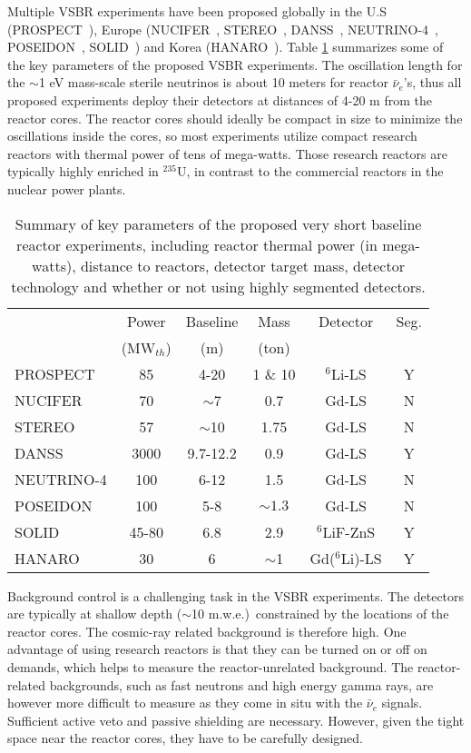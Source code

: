 Multiple VSBR experiments have been proposed globally in the U.S (PROSPECT~\cite{PROSPECT}), Europe (NUCIFER~\cite{NUCIFER-2010, NUCIFER-2014}, STEREO~\cite{NUCIFER-2014}, DANSS~\cite{DANSS}, NEUTRINO-4~\cite{NEUTRINO4-2012,NEUTRINO4-2014}, POSEIDON~\cite{POSEIDON}, SOLID~\cite{SoLid}) and Korea (HANARO~\cite{HANARO}). 
Table \ref{tab:sterile} summarizes some of the key parameters of the proposed VSBR experiments. 
The oscillation length for the $\sim$1 eV mass-scale sterile neutrinos is about 10 meters for reactor $\bar\nu_e$'s, thus all proposed experiments deploy their detectors at distances of 4-20 m from the reactor cores. 
The reactor cores should ideally be compact in size to minimize the oscillations inside the cores, so most experiments utilize compact research reactors with thermal power of tens of mega-watts. Those research reactors are typically highly enriched in $^{235}$U, in contrast to the commercial reactors in the nuclear power plants. 

\begin{table}[tb]
  \begin{tabular}{lccccc}
  \hline
  & Power & Baseline & Mass & Detector & Seg. \\
  & (MW$_{th}$) & (m) & (ton) &    & \\
  \hline
  PROSPECT  & 85  & 4-20 & 1 \& 10  & $^6$Li-LS & Y \\
  NUCIFER   & 70 & $\sim$7  & 0.7 & Gd-LS & N \\
  STEREO & 57  & $\sim$10 & 1.75  & Gd-LS & N \\
  DANSS & 3000  & 9.7-12.2  & 0.9  & Gd-LS & Y \\
  NEUTRINO-4 & 100  & 6-12  & 1.5  & Gd-LS & N \\
  POSEIDON & 100  & 5-8  & $\sim1.3$ & Gd-LS & N \\
  SOLID & 45-80 & 6.8  & 2.9  & $^6$LiF-ZnS & Y \\
  HANARO & 30  & 6  & $\sim$1  & Gd($^6$Li)-LS & Y \\
  \hline
  \end{tabular}
  \caption{Summary of key parameters of the proposed very short baseline reactor experiments, including reactor thermal power (in mega-watts), distance to reactors, detector target mass, detector technology and whether or not using highly segmented detectors.}
\label{tab:sterile}
\end{table}

Background control is a challenging task in the VSBR experiments. 
The detectors are typically at shallow depth ($\sim$10 m.w.e.)\ constrained by the locations of the reactor cores. 
The cosmic-ray related background is therefore high. 
One advantage of using research reactors is that they can be turned on or off on demands, which helps to measure the reactor-unrelated background. 
The reactor-related backgrounds, such as fast neutrons and high energy gamma rays, are however more difficult to measure as they come in situ with the $\bar\nu_e$ signals. Sufficient active veto and passive shielding are necessary. However, given the tight space near the reactor cores,  they have to be carefully designed.

